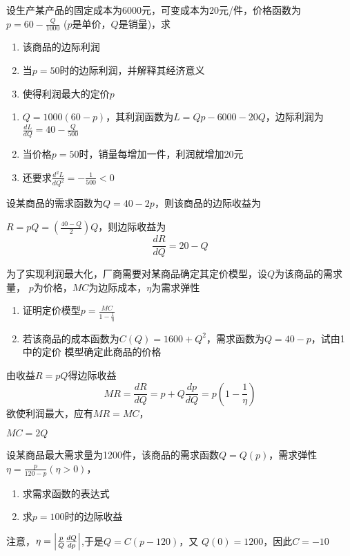 \documentclass{article}
\begin{document}
\begin{examplle}[]
设生产某产品的固定成本为6000元，可变成本为20元/件，价格函数为
\(p=60-\frac{Q}{1000}\)
(\(p\)是单价，\(Q\)是销量)，求
\begin{enumerate}
\item 该商品的边际利润
\item 当\(p=50\)时的边际利润，并解释其经济意义
\item 使得利润最大的定价\(p\)
\end{enumerate}


\begin{enumerate}
\item \(Q=1000(60-p)\)，其利润函数为\(L=Qp-6000-20Q\)，边际利润为
\(\frac{dL}{dQ}=40-\frac{Q}{500}\)
\item 当价格\(p=50\)时，销量每增加一件，利润就增加20元
\item 还要求\(\frac{d^2L}{dQ^2}=-\frac{1}{500}<0\)
\end{enumerate}
\end{examplle}

\begin{examplle}[]
设某商品的需求函数为\(Q=40-2p\)，则该商品的边际收益为

\(R=pQ=\left(\frac{40-Q}{2}\right)Q\)，则边际收益为
\begin{equation*}
\frac{dR}{dQ}=20-Q
\end{equation*}
\end{examplle}

\begin{examplle}[]
为了实现利润最大化，厂商需要对某商品确定其定价模型，设\(Q\)为该商品的需求量，
\(p\)为价格，\(MC\)为边际成本，\(\eta\)为需求弹性
\begin{enumerate}
\item 证明定价模型\(p=\frac{MC}{1-\frac{1}{\eta}}\)
\item 若该商品的成本函数为\(C(Q)=1600+Q^2\)，需求函数为\(Q=40-p\)，试由1中的定价
模型确定此商品的价格
\end{enumerate}


由收益\(R=pQ\)得边际收益
\begin{equation*}
MR=\frac{dR}{dQ}=p+Q\frac{dp}{dQ}=p(1-\frac{1}{\eta})
\end{equation*}
欲使利润最大，应有\(MR=MC\)，

\(MC=2Q\)
\end{examplle}

\begin{examplle}[]
设某商品最大需求量为1200件，该商品的需求函数\(Q=Q(p)\)，需求弹性
\(\eta=\frac{p}{120-p}(\eta>0)\)，
\begin{enumerate}
\item 求需求函数的表达式
\item 求\(p=100\)时的边际收益
\end{enumerate}


注意，\(\eta=\abs{\frac{p}{Q}\frac{dQ}{dp}}\),于是\(Q=C(p-120)\)，又
\(Q(0)=1200\)，因此\(C=-10\)
\end{examplle}
\end{document}
